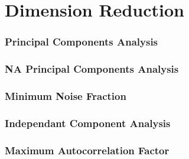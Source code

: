 \chapter{Dimension Reduction}

\subsection{Principal Components Analysis}



\subsection{NA Principal Components Analysis}



\subsection{Minimum Noise Fraction}



\subsection{Independant Component Analysis}



\subsection{Maximum Autocorrelation Factor}




